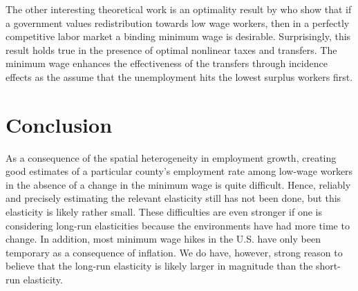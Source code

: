 \documentclass[11pt]{amsart}
\begin{document}
The other interesting theoretical work is an optimality result by \citeauthor{lee2012optimal} who show that if a government values redistribution towards low wage workers, then in a perfectly competitive labor market a binding minimum wage is desirable. 
Surprisingly, this result holds true in the presence of optimal nonlinear taxes and transfers. 
The minimum wage enhances the effectiveness of the transfers through incidence effects as the assume that the unemployment hits the lowest surplus workers first. 

\section*{Conclusion}

As a consequence of the spatial heterogeneity in employment growth, creating good estimates of a particular county's employment rate among low-wage workers in the absence of a change in the minimum wage is quite difficult. 
Hence, reliably and precisely estimating the relevant elasticity still has not been done, but this elasticity is likely rather small. 
These difficulties are even stronger if one is considering long-run elasticities because the environments have had more time to change. 
In addition, most minimum wage hikes in the U.S. have only been temporary as a consequence of inflation.
We do have, however, strong reason to believe that the long-run elasticity is likely larger in magnitude than the short-run elasticity. 

\newpage
\printbibliography
\end{document}
